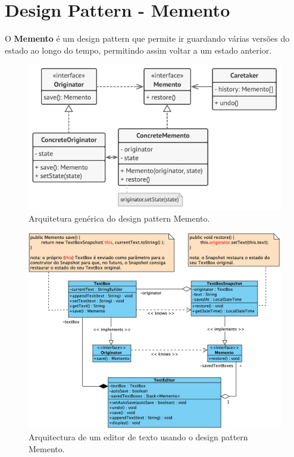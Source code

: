 \section{Design Pattern - Memento}
\label{sec:memento}

\hspace{5mm} O \textbf{Memento} é um design pattern que permite ir guardando várias versões do estado ao longo do tempo, permitindo assim voltar a um estado anterior.

\begin{figure}[H]
    \centering
    \includegraphics[scale=0.55]{images/generic_memento_class_diagram.png}
    \caption{Arquitetura genérica do design pattern Memento.}
    \label{fig:diagrama-classes-memento}
\end{figure}

\begin{figure}[H]
    \centering
    \includegraphics[scale=0.8]{images/memento_class_diagram.png}
    \caption{Arquitectura de um editor de texto usando o design pattern Memento.}
    \label{fig:diagrama-classes-memento}
\end{figure}

